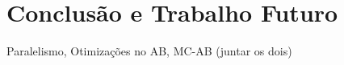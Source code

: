 \documentclass[12pt,a4paper,oneside]{article}
\begin{document}
\lipsum[1]

\lipsum[2]

\lipsum[3]


\section{Conclusão e Trabalho Futuro}
\label{sec:conc}

Paralelismo, Otimizações no AB, MC-AB (juntar os dois)\cite{Dutra:2015}

\lipsum[1]

\lipsum[2]



\end{document}
